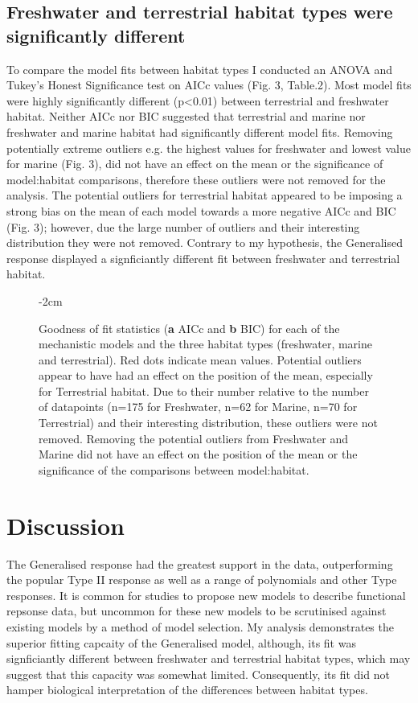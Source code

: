 \documentclass[11pt]{article}
\begin{document}
        \subsection{Freshwater and terrestrial habitat types were significantly different}
            To compare the model fits between habitat types I conducted an ANOVA and Tukey's Honest Significance test on AICc values (Fig. 3, Table.2). Most model fits were highly significantly different (p\textless0.01) between terrestrial and freshwater habitat. Neither AICc nor BIC suggested that terrestrial and marine nor freshwater and marine habitat had significantly different model fits. Removing potentially extreme outliers e.g. the highest values for freshwater and lowest value for marine (Fig. 3), did not have an effect on the mean or the significance of model:habitat comparisons, therefore these outliers were not removed for the analysis. The potential outliers for terrestrial habitat appeared to be imposing a strong bias on the mean of each model towards a more negative AICc and BIC (Fig. 3); however, due the large number of outliers and their interesting distribution they were not removed. Contrary to my hypothesis, the Generalised response displayed a signficiantly different fit between freshwater and terrestrial habitat.

            \begin{figure}[htpb]
                \centering
                \addtolength{\leftskip} {-2cm}
                \addtolength{\rightskip}{-2cm}
                \caption{Goodness of fit statistics (\textbf{a} AICc and \textbf{b} BIC) for each of the mechanistic models and the three habitat types (freshwater, marine and terrestrial). Red dots indicate mean values. Potential outliers appear to have had an effect on the position of the mean, especially for Terrestrial habitat. Due to their number relative to the number of datapoints (n=175 for Freshwater, n=62 for Marine, n=70 for Terrestrial) and their interesting distribution, these outliers were not removed. Removing the potential outliers from Freshwater and Marine did not have an effect on the position of the mean or the significance of the comparisons between model:habitat.}
            \end{figure}

    \section{Discussion}
        The Generalised response had the greatest support in the data, outperforming the popular Type II response as well as a range of polynomials and other Type responses. It is common for studies to propose new models to describe functional repsonse data, but uncommon for these new models to be scrutinised against existing models by a method of model selection. My analysis demonstrates the superior fitting capcaity of the Generalised model, although, its fit was signficiantly different between freshwater and terrestrial habitat types, which may suggest that this capacity was somewhat limited. Consequently, its fit did not hamper biological interpretation of the differences between habitat types.
\end{document}
